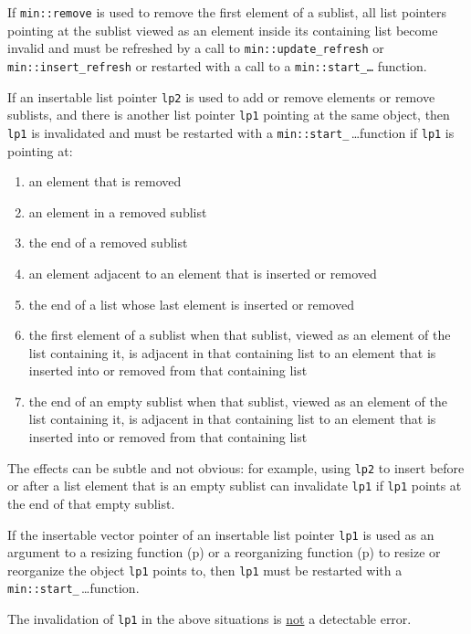 \documentclass[12pt]{article}
\newcommand{\pagref}[1]{p\pageref{#1}}
\newcommand{\EOL}{\penalty \exhyphenpenalty}
\begin{document}
If {\tt min::\EOL remove} is used to remove the first element of
a sublist,
all list pointers pointing at the sublist viewed as an element
inside its containing list
become invalid and must be refreshed by
a call to {\tt min::\EOL update\_\EOL refresh} or
{\tt min::\EOL insert\_\EOL refresh} or restarted with a call to a
{\tt min::\EOL start\_\ldots} function.

If an insertable list pointer {\tt lp2} is used to add or remove
elements or remove sublists, and there is another list pointer {\tt lp1}
pointing at the same object, then {\tt lp1} is invalidated and must
be restarted with a
{\tt min::\EOL start\_}\,\ldots function\label{RESTARTING_LIST_PTR}
if {\tt lp1} is pointing at:

\begin{enumerate}
\item an element that is removed
\item an element in a removed sublist
\item the end of a removed sublist
\item an element adjacent to an element that is inserted or removed
\item the end of a list whose last element is inserted or removed
\item the first element of a sublist
      when that sublist, viewed as an element of the list containing
      it, is adjacent in that containing list to
      an element that is inserted into or removed from that containing list
\item the end of an empty sublist
      when that sublist, viewed as an element of the list containing
      it, is adjacent in that containing list to
      an element that is inserted into or removed from that containing list
\end{enumerate}

The effects can be subtle
and not obvious: for example, using {\tt lp2} to insert before or after
a list element that is an empty sublist can invalidate {\tt lp1}
if {\tt lp1} points at the end of that empty sublist.

If the insertable vector pointer of an insertable list pointer
{\tt lp1} is used as an argument to
a resizing function (\pagref{RESIZING-FUNCTIONS}) or
a reorganizing function (\pagref{REORGANIZING-FUNCTIONS}) to resize
or reorganize the object {\tt lp1} points to, then
{\tt lp1} must be restarted with a
{\tt min::\EOL start\_}\,\ldots function.

The invalidation of {\tt lp1} in the above situations
is \underline{not} a detectable error.
\end{document}
